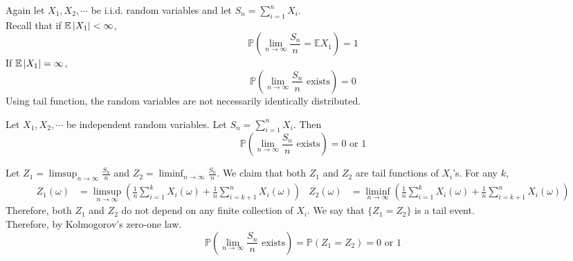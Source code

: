 \documentclass{huhtakm-template-book}
\newcommand{\prob}{\mathbb{P}}
\newcommand{\expect}{\mathbb{E}}
\begin{document}
Again let $X_{1},X_{2},\cdots$ be i.i.d. random variables and let $S_{n}=\sum_{i=1}^{n}X_{i}$.\\
Recall that if $\expect\abs{X_{1}}<\infty$,
\begin{equation*}
    \prob\left(\lim_{n\to\infty}\frac{S_{n}}{n}=\expect X_{1}\right)=1
\end{equation*}
If $\expect\abs{X_{1}}=\infty$,
\begin{equation*}
    \prob\left(\lim_{n\to\infty}\frac{S_{n}}{n}\text{ exists}\right)=0
\end{equation*}
Using tail function, the random variables are not necessarily identically distributed.
\begin{thm}
    Let $X_{1},X_{2},\cdots$ be independent random variables. Let $S_{n}=\sum_{i=1}^{n}X_{i}$. Then
    \begin{equation*}
        \prob\left(\lim_{n\to\infty}\frac{S_{n}}{n}\text{ exists}\right)=0\text{ or }1
    \end{equation*}
\end{thm}
\begin{proofing}
    Let $Z_{1}=\limsup_{n\to\infty}\frac{S_{n}}{n}$ and $Z_{2}=\liminf_{n\to\infty}\frac{S_{n}}{n}$. We claim that both $Z_{1}$ and $Z_{2}$ are tail functions of $X_{i}$'s. For any $k$,
    \begin{align*}
        Z_{1}(\omega)&=\limsup_{n\to\infty}\left(\frac{1}{n}\sum_{i=1}^{k}X_{i}(\omega)+\frac{1}{n}\sum_{i=k+1}^{n}X_{i}(\omega)\right) & Z_{2}(\omega)&=\liminf_{n\to\infty}\left(\frac{1}{n}\sum_{i=1}^{k}X_{i}(\omega)+\frac{1}{n}\sum_{i=k+1}^{n}X_{i}(\omega)\right)
    \end{align*}
    Therefore, both $Z_{1}$ and $Z_{2}$ do not depend on any finite collection of $X_{i}$. We say that $\{Z_{1}=Z_{2}\}$ is a tail event.\\
    Therefore, by Kolmogorov's zero-one law.
    \begin{equation*}
        \prob\left(\lim_{n\to\infty}\frac{S_{n}}{n}\text{ exists}\right)=\prob(Z_{1}=Z_{2})=0\text{ or }1
    \end{equation*}
\end{proofing}
\end{document}
